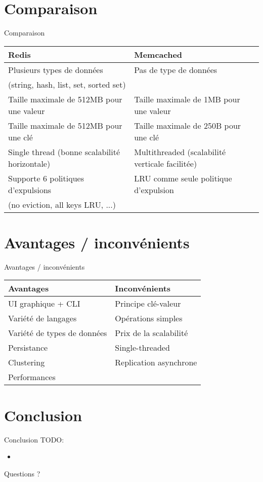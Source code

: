 \documentclass[aspectratio=169]{beamer}
\newcommand{\TODO}{TODO:}
\begin{document}
\section{Comparaison}
\begin{frame}{Comparaison}
 \begin{center}\small
  \begin{tabular}{|l|l|}
     \hline
      \textbf{Redis} & \textbf{Memcached} \\
     \hline
     \hline
        Plusieurs types de données & Pas de type de données  \\
        (string, hash, list, set, sorted set) & \\
     \hline
     Taille maximale de 512MB pour une valeur & Taille maximale de 1MB pour une valeur \\
     \hline
     Taille maximale de 512MB pour une clé  & Taille maximale de 250B pour une clé \\ 
     \hline
     Single thread (bonne scalabilité horizontale) & Multithreaded (scalabilité verticale facilitée) \\
     \hline
    Supporte 6 politiques d'expulsions & LRU comme seule politique d'expulsion  \\
     (no eviction, all keys LRU, ...) & \\
     \hline
     \end{tabular}
 \end{center}
\end{frame}



\section{Avantages / inconvénients}
\begin{frame}{Avantages / inconvénients}
  \begin{center}
     \begin{tabular}{|l|l|}
     \hline
      \textbf{Avantages} & \textbf{Inconvénients} \\
     \hline
     \hline
        UI graphique + CLI & Principe clé-valeur \\
     \hline
     Variété de langages & Opérations simples \\
     \hline
     Variété de types de données & Prix de la scalabilité \\
     \hline
     Persistance & Single-threaded \\
     \hline
     Clustering & Replication asynchrone \\
     \hline
     Performances & \\
     \hline
     \end{tabular}

    \end{center}
\end{frame}

\section{Conclusion}
\begin{frame}{Conclusion}
\TODO
 \begin{itemize}
  \item 
 \end{itemize}
\end{frame}

\begin{frame}{Questions ?}
\end{frame}
\end{document}
